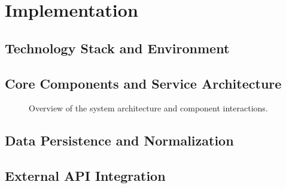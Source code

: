 
\section{Implementation}
\label{sec:implementation}


\subsection{Technology Stack and Environment}
\label{subsec:tech_stack}


\subsection{Core Components and Service Architecture}
\label{subsec:core_components}


\begin{figure}[h]
	\centering
	\caption{Overview of the system architecture and component interactions.}
	\label{fig:arch_overview}
\end{figure}

\subsection{Data Persistence and Normalization}
\label{subsec:persistence}


\subsection{External API Integration}
\label{subsec:api_integration}

